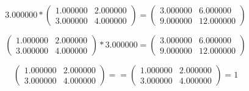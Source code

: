 \documentclass{article}
\begin{document}
$$3.000000 * \begin{pmatrix}
1.000000 & 2.000000 \\
3.000000 & 4.000000
\end{pmatrix} = \begin{pmatrix}
3.000000 & 6.000000 \\
9.000000 & 12.000000
\end{pmatrix}$$

$$\begin{pmatrix}
1.000000 & 2.000000 \\
3.000000 & 4.000000
\end{pmatrix} * 3.000000 = \begin{pmatrix}
3.000000 & 6.000000 \\
9.000000 & 12.000000
\end{pmatrix}$$

$$\begin{pmatrix}
1.000000 & 2.000000 \\
3.000000 & 4.000000
\end{pmatrix} == \begin{pmatrix}
1.000000 & 2.000000 \\
3.000000 & 4.000000
\end{pmatrix} = 1$$
\end{document}
